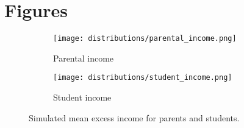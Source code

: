 \newpage
\section{Figures} \label{appendix:figures}
\renewcommand{\thefigure}{\thesection \arabic{figure}}
\setcounter{figure}{0}


\begin{figure}[htbp]
  \centering
  \begin{subfigure}[t]{0.42\linewidth}
    \texttt{[image: distributions/parental\_income.png]}
    \caption{Parental income}
    \label{fig:parents-income-distribution}
  \end{subfigure}
  \hfill
  \begin{subfigure}[t]{0.42\linewidth}
    \texttt{[image: distributions/student\_income.png]}
    \caption{Student income}
    \label{fig:student-income-distribution}
  \end{subfigure}
  \caption{Simulated mean excess income for parents and students.}
  \label{fig:income-distributions}
\end{figure}


